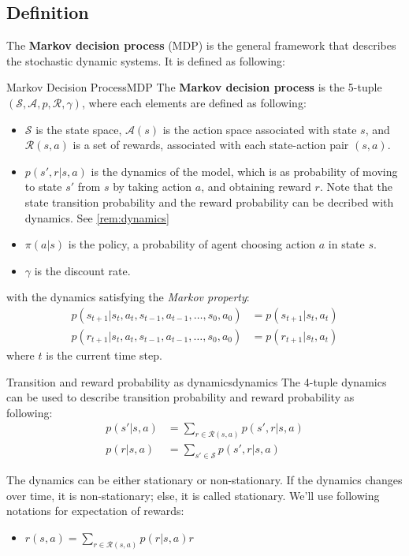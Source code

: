    \subsection{Definition}
        The \textbf{Markov decision process} (MDP) is the general framework that describes the stochastic dynamic systems. It is defined as following:
        \begin{defn}{Markov Decision Process}{MDP}
            The \textbf{Markov decision process} is the 5-tuple $(\mathcal{S},\mathcal{A},p,\mathcal{R},\gamma)$, where each elements are defined as following:
            \begin{itemize}
                \item $\mathcal{S}$ is the state space, $\mathcal{A}(s)$ is the action space associated with state $s$, and $\mathcal{R}(s,a)$ is a set of rewards, associated with each state-action pair $(s,a)$.
                \item $p(s',r|s,a)$ is the dynamics of the model, which is as probability of moving to state $s'$ from $s$ by taking action $a$, and obtaining reward $r$.
                Note that the state transition probability and the reward probability can be decribed with dynamics. See \ref{rem:dynamics}
                \item $\pi(a|s)$ is the policy, a probability of agent choosing action $a$ in state $s$.
                \item $\gamma$ is the discount rate.
            \end{itemize}
            with the dynamics satisfying the \emph{Markov property}:
            \begin{align}
                p(s_{t+1}|s_t,a_t,s_{t-1},a_{t-1},\dots,s_0,a_0) &= p(s_{t+1}|s_{t},a_{t}) \\
                p(r_{t+1}|s_t,a_t,s_{t-1},a_{t-1},\dots,s_0,a_0) &= p(r_{t+1}|s_{t},a_{t})
            \end{align}
            where $t$ is the current time step.
        \end{defn}
        \begin{rem}{Transition and reward probability as dynamics}{dynamics}
            The 4-tuple dynamics can be used to describe transition probability and reward probability as following:
            \begin{align}
                p(s'|s,a) &= \sum_{r \in \mathcal{R}(s,a)}p(s',r|s,a) \\
                p(r|s,a) &= \sum_{s' \in \mathcal{S}}p(s',r|s,a)
            \end{align}
        \end{rem}
        The dynamics can be either stationary or non-stationary. If the dynamics changes over time, it is non-stationary; else, it is called stationary.
        We'll use following notations for expectation of rewards:
        \begin{itemize}
            \item $r(s,a) = \sum_{r \in \mathcal{R}(s,a)} p(r|s,a)r$
        \end{itemize}
